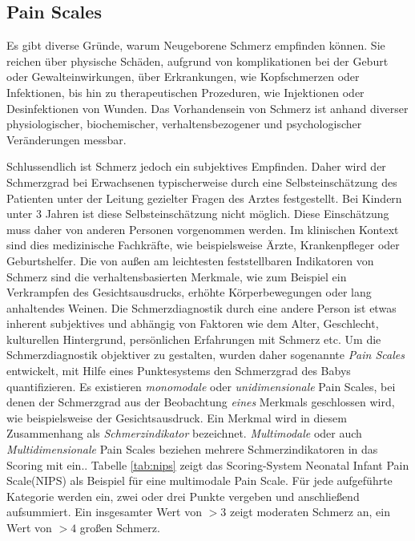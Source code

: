 \subsection{Pain Scales}
\label{sec:painScores}

Es gibt diverse Gründe, warum Neugeborene Schmerz empfinden können. Sie reichen über physische Schäden, aufgrund von komplikationen bei der Geburt oder Gewalteinwirkungen, über Erkrankungen, wie Kopfschmerzen oder Infektionen, bis hin zu therapeutischen Prozeduren, wie Injektionen oder Desinfektionen von Wunden.  Das Vorhandensein von Schmerz ist anhand diverser physiologischer, biochemischer, verhaltensbezogener und psychologischer Veränderungen messbar.\cite[S. 441]{PainAssessment01}

Schlussendlich ist Schmerz jedoch ein subjektives Empfinden. Daher wird der Schmerzgrad bei Erwachsenen typischerweise durch eine Selbsteinschätzung des Patienten unter der Leitung gezielter Fragen des Arztes festgestellt. Bei Kindern unter 3 Jahren ist diese Selbsteinschätzung nicht möglich. Diese Einschätzung muss daher von anderen Personen vorgenommen werden. Im klinischen Kontext sind dies medizinische Fachkräfte, wie beispielsweise Ärzte, Krankenpfleger oder Geburtshelfer. Die von außen am leichtesten feststellbaren Indikatoren von Schmerz sind die verhaltensbasierten Merkmale, wie zum Beispiel ein Verkrampfen des Gesichtsausdrucks, erhöhte Körperbewegungen oder lang anhaltendes Weinen.\cite[S. 438]{PainAssessment01} Die Schmerzdiagnostik durch eine andere Person ist etwas inherent subjektives und abhängig von Faktoren wie dem Alter, Geschlecht, kulturellen Hintergrund, persönlichen Erfahrungen mit Schmerz etc.\cite[S. 3]{overview} Um die Schmerzdiagnostik objektiver zu gestalten, wurden daher sogenannte \emph{Pain Scales} entwickelt, mit Hilfe eines Punktesystems den Schmerzgrad des Babys quantifizieren.\cite[S. 438 - 439]{PainAssessment01} Es existieren \emph{monomodale} oder \emph{unidimensionale} Pain Scales, bei denen der Schmerzgrad aus der Beobachtung \emph{eines} Merkmals geschlossen wird, wie beispielsweise der Gesichtsausdruck. Ein Merkmal wird in diesem Zusammenhang als \emph{Schmerzindikator} bezeichnet. \emph{ Multimodale} oder auch \emph{Multidimensionale} Pain Scales beziehen mehrere Schmerzindikatoren in das Scoring mit ein.\cite[S. 69 - 71]{PainAssessment02}. Tabelle \ref{tab:nips} zeigt das Scoring-System \glqq Neonatal Infant Pain Scale\grqq{}(NIPS) als Beispiel für eine multimodale Pain Scale. Für jede aufgeführte Kategorie werden ein, zwei oder drei Punkte vergeben und anschließend aufsummiert. Ein insgesamter Wert von $>3$ zeigt moderaten Schmerz an, ein Wert von $>4$ großen Schmerz.\cite{nips}

